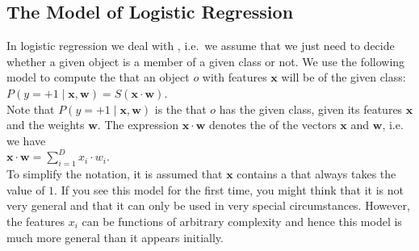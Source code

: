 \subsection{The Model of Logistic Regression}
In logistic regression we deal with , 
i.e.~we assume that we just need to decide
whether a given object is a member of a given class or not.  We use the following model to compute the  that an
object $o$ with features $\mathbf{x}$ will be of the given class: 
\\[0.2cm]
\hspace*{1.3cm}
$P(y=+1\;|\;\mathbf{x},\mathbf{w}) = S(\mathbf{x} \cdot \mathbf{w})$.
\\[0.2cm]
Note that $P(y=+1\;|\;\mathbf{x},\mathbf{w})$ is the  that $o$ has the given
class, given its features $\mathbf{x}$ and the weights $\mathbf{w}$.  The expression $\mathbf{x}
\cdot \mathbf{w}$ denotes the  of the vectors $\mathbf{x}$ and $\mathbf{w}$,  
i.e. we have
\\[0.2cm]
\hspace*{1.3cm}
$\mathbf{x} \cdot \mathbf{w} = \sum\limits_{i=1}^D x_i \cdot w_i$.
\\[0.2cm] 
To simplify the notation, it is assumed that $\mathbf{x}$ contains a  
that always takes the value of $1$.
If you see this model for the first time, you might think that it is not very general and that it can only be
used in very special circumstances.  However,  the features $x_i$ can be functions of arbitrary complexity
and hence this model is much more general than it appears initially.


